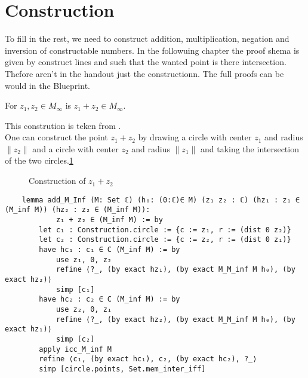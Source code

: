 \section{Construction}
To fill in the rest, we need to construct addition, multiplication, negation and inversion of constructable numbers.
In the followuing chapter the proof shema is given by construct lines and such that the wanted point is there intersection. Thefore aren't in the handout just the constructionn.
The full proofs can be would in the Blueprint.

\begin{lemma}
    \label{lem:construction_add}
    For $z_1, z_2 \in M_{\infty}$ is $z_1 + z_2 \in M_{\infty}$.
\end{lemma}
This constrution is teken from \cite{JAN_SCHROEER:2023}.\\
One can construct the point $z_1 + z_2$ by drawing a circle with center $z_1$ and radius $\|z_2\|$ and a circle with center $z_2$ and radius $\|z_1\|$ and taking the intersection of the two circles.\ref{Fig.2}

\begin{figure}[h!]
    \centering
    \caption{Construction of $z_1 + z_2$}
    \label{Fig.2}
\end{figure}

\begin{lstlisting}
    lemma add_M_Inf (M: Set ℂ) (h₀: (0:ℂ)∈ M) (z₁ z₂ : ℂ) (hz₁ : z₁ ∈ (M_inf M)) (hz₂ : z₂ ∈ (M_inf M)):
            z₁ + z₂ ∈ (M_inf M) := by
        let c₁ : Construction.circle := {c := z₁, r := (dist 0 z₂)}
        let c₂ : Construction.circle := {c := z₂, r := (dist 0 z₁)}
        have hc₁ : c₁ ∈ C (M_inf M) := by
            use z₁, 0, z₂
            refine ⟨?_, (by exact hz₁), (by exact M_M_inf M h₀), (by exact hz₂)⟩
            simp [c₁]
        have hc₂ : c₂ ∈ C (M_inf M) := by
            use z₂, 0, z₁
            refine ⟨?_, (by exact hz₂), (by exact M_M_inf M h₀), (by exact hz₁)⟩
            simp [c₂]
        apply icc_M_inf M
        refine ⟨c₁, (by exact hc₁), c₂, (by exact hc₂), ?_⟩
        simp [circle.points, Set.mem_inter_iff]
\end{lstlisting}

